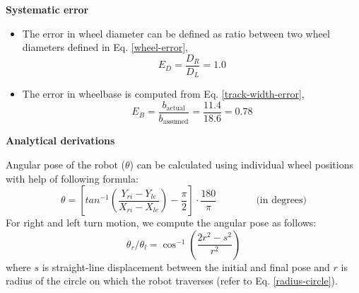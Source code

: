 \textbf{Systematic error}\\
\begin{itemize}
\item The error in wheel diameter can be defined as ratio between two wheel diameters defined in Eq. \ref{wheel-error},
\begin{equation}
E_D = \frac{D_R}{D_L} = 1.0
\end{equation}

\item The error in wheelbase is computed from Eq. \ref{track-width-error},
\begin{equation}
E_B = \frac{b_{\text{actual}}}{b_{\text{assumed}}} = \frac{11.4}{18.6} = 0.78
\end{equation}
\end{itemize}
\textbf{Analytical derivations}
\par Angular pose of the robot ($\theta$) can be calculated using individual wheel positions with help of following formula:
\begin{equation}
\theta = \left[ tan^{-1}\left(\frac{Y_{ri} - Y_{le}}{X_{ri} - X_{le}}\right) - \frac{\pi}{2} \right] \cdot \frac{180}{\pi} \qquad\qquad \text{(in degrees)}
\label{theta-orientation}
\end{equation}
For right and left turn motion, we compute the angular pose as follows:
\begin{equation}
\theta_r/ \theta_l = \cos^{-1}\left(\frac{2r^2 - s^2}{r^2}\right)
\label{lr-ang-pose}
\end{equation}
where $s$ is straight-line displacement between the initial and final pose and $r$ is radius of the circle on which the robot traverses (refer to Eq. \ref{radius-circle}).
